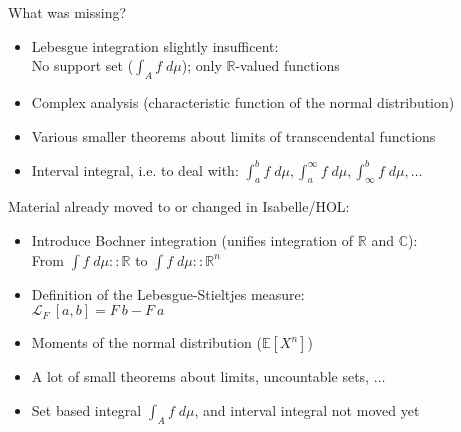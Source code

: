 \documentclass[usepdftitle=false]{beamer}
\begin{document}
\begin{frame}

What was missing?

\begin{itemize}
\item Lebesgue integration slightly insufficent: \\
  No support set ($\int_A f\;d\mu$); only $\mathbb{R}$-valued functions
\pause
\item Complex analysis (characteristic function of the normal distribution)
\pause

\item Various smaller theorems about limits of transcendental functions
\pause

\item Interval integral, i.e. to deal with: $\int_{a}^b f\; d\mu, \int_{a}^\infty f\; d\mu, \int_{\infty}^b f\; d\mu, \ldots$

\end{itemize}

\pause

Material already moved to or changed in Isabelle/HOL:

\begin{itemize}

\item Introduce Bochner integration (unifies integration of $\mathbb{R}$ and $\mathbb{C}$): \\
  From $\int {f}\; d\!\mu :: \mathbb{R}$ to $\int {f}\; d\!\mu :: \mathbb{R}^n$

\pause

\item Definition of the Lebesgue-Stieltjes measure: \\ 
  $\mathcal{L}_F~[a, b] = F~b - F~a$

\pause

\item Moments of the normal distribution ($\mathbb{E}[X^n]$)

\pause

\item A lot of small theorems about limits, uncountable sets, $\dots$

\pause

\item Set based integral $\int_A f\;d\mu$, and interval integral not moved yet

\end{itemize}

\end{frame}
\end{document}

